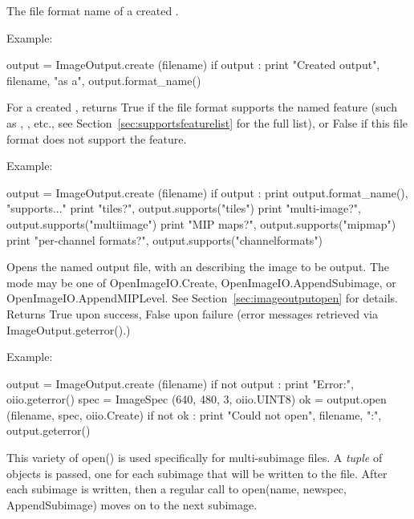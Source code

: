 The file format name of a created \ImageOutput.

\noindent Example:
\begin{code}
    output = ImageOutput.create (filename)
    if output :
        print "Created output", filename, "as a", output.format_name()
\end{code}
\apiend

For a created \ImageOutput, returns {\cf True} if the file format supports
the named feature (such as , , etc., see
Section~\ref{sec:supportsfeaturelist} for the full list), or {\cf False}
if this file format does not support the feature.

\noindent Example:
\begin{code}
    output = ImageOutput.create (filename)
    if output :
        print output.format_name(), "supports..."
        print "tiles?", output.supports("tiles")
        print "multi-image?", output.supports("multiimage")
        print "MIP maps?", output.supports("mipmap")
        print "per-channel formats?", output.supports("channelformats")
\end{code}
\apiend

Opens the named output file, with an \ImageSpec describing the image to
be output.  The {\cf mode} may be one of {\cf OpenImageIO.Create},
{\cf OpenImageIO.AppendSubimage}, or {\cf OpenImageIO.AppendMIPLevel}.
See Section~\ref{sec:imageoutputopen} for details.  Returns {\cf True}
upon success, {\cf False} upon failure (error messages retrieved via
{\cf ImageOutput.geterror()}.)

\noindent Example:
\begin{code}
    output = ImageOutput.create (filename)
    if not output :
        print "Error:", oiio.geterror()
    spec = ImageSpec (640, 480, 3, oiio.UINT8)
    ok = output.open (filename, spec, oiio.Create)
    if not ok :
        print "Could not open", filename, ":", output.geterror()
\end{code}
\apiend

This variety of {\cf open()} is used specifically for multi-subimage files.
A \emph{tuple} of \ImageSpec objects is passed, one for each subimage
that will be written to the file.  After each subimage is written, then
a regular call to {\cf open(name, newspec, {\ce AppendSubimage})} moves
on to the next subimage.
\apiend

